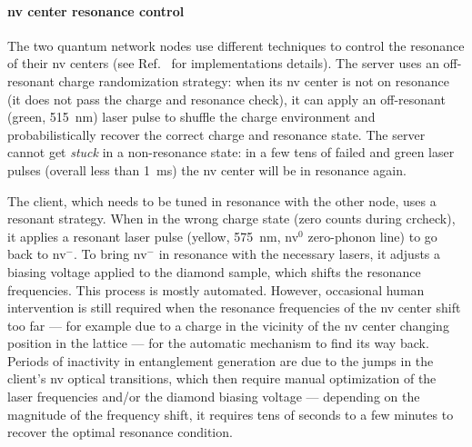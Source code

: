 \paragraph{\acrshort{nv} center resonance control}

The two quantum network nodes use different techniques to control the resonance of their
\acrshort{nv} centers (see Ref.~\cite{pompili_2021_multinode} for implementations details). The
server uses an off-resonant charge randomization strategy: when its \acrshort{nv} center is not on
resonance (it does not pass the charge and resonance check), it can apply an off-resonant (green,
\qty{515}{\nm}) laser pulse to shuffle the charge environment and probabilistically recover the
correct charge and resonance state. The server cannot get \emph{stuck} in a non-resonance state: in
a few tens of failed  and green laser pulses (overall less than \qty{1}{\ms})
the \acrshort{nv} center will be in resonance again.

The client, which needs to be tuned in resonance with the other node, uses a resonant strategy. When
in the wrong charge state (zero counts during \acrshort{crcheck}), it applies a resonant laser pulse
(yellow, \qty{575}{\nm}, \acrshort{nv}${}^0$ zero-phonon line) to go back to \acrshort{nv}${}^-$. To
bring \acrshort{nv}${}^-$ in resonance with the necessary lasers, it adjusts a biasing voltage
applied to the diamond sample, which shifts the resonance frequencies. This process is mostly
automated. However, occasional human intervention is still required when the resonance frequencies
of the \acrshort{nv} center shift too far --- for example due to a charge in the vicinity of the
\acrshort{nv} center changing position in the lattice --- for the automatic mechanism to find its
way back. Periods of inactivity in entanglement generation are due to the jumps in the client's
\acrshort{nv} optical transitions, which then require manual optimization of the laser frequencies
and/or the diamond biasing voltage --- depending on the magnitude of the frequency shift, it
requires tens of seconds to a few minutes to recover the optimal resonance condition.

\printbibliography[heading=subbibintoc,title={References}]
